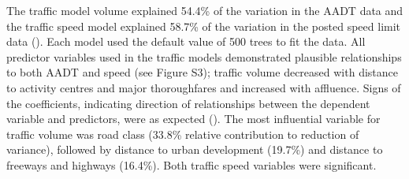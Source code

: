 The traffic model volume explained 54.4\% of the variation in the AADT data and the traffic speed model explained 58.7\% of the variation in the posted speed limit data ().  Each model used the default value of 500 trees to fit the data.  All predictor variables used in the traffic models demonstrated plausible relationships to both AADT and speed (see Figure S3); traffic volume decreased with distance to activity centres and major thoroughfares and increased with affluence. Signs of the coefficients, indicating direction of relationships between the dependent variable and predictors, were as expected (). The most influential variable for traffic volume was road class (33.8\% relative contribution to reduction of variance), followed by distance to urban development (19.7\%) and distance to freeways and highways (16.4\%). Both traffic speed variables were significant.

